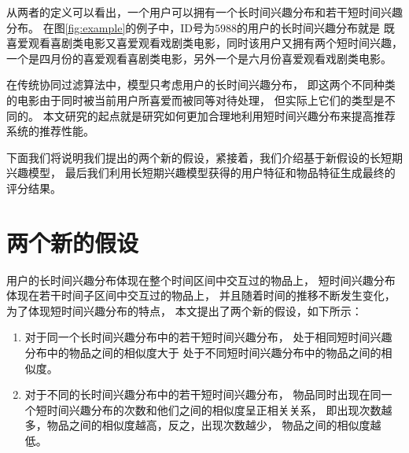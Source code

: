 从两者的定义可以看出，一个用户可以拥有一个长时间兴趣分布和若干短时间兴趣分布。
在图\ref{fig:example}的例子中，ID号为$5988$的用户的长时间兴趣分布就是
既喜爱观看喜剧类电影又喜爱观看戏剧类电影，同时该用户又拥有两个短时间兴趣，
一个是四月份的喜爱观看喜剧类电影，另外一个是六月份喜爱观看戏剧类电影。

在传统协同过滤算法中，模型只考虑用户的长时间兴趣分布，
即这两个不同种类的电影由于同时被当前用户所喜爱而被同等对待处理，
但实际上它们的类型是不同的。
本文研究的起点就是研究如何更加合理地利用短时间兴趣分布来提高推荐系统的推荐性能。

下面我们将说明我们提出的两个新的假设，紧接着，我们介绍基于新假设的长短期兴趣模型，
最后我们利用长短期兴趣模型获得的用户特征和物品特征生成最终的评分结果。

\section{两个新的假设}
用户的长时间兴趣分布体现在整个时间区间中交互过的物品上，
短时间兴趣分布体现在若干时间子区间中交互过的物品上，
并且随着时间的推移不断发生变化，为了体现短时间兴趣分布的特点，
本文提出了两个新的假设，如下所示：

\begin{enumerate}
\item 对于同一个长时间兴趣分布中的若干短时间兴趣分布，
处于相同短时间兴趣分布中的物品之间的相似度大于
处于不同短时间兴趣分布中的物品之间的相似度。
\item 对于不同的长时间兴趣分布中的若干短时间兴趣分布，
物品同时出现在同一个短时间兴趣分布的次数和他们之间的相似度呈正相关关系，
即出现次数越多，物品之间的相似度越高，反之，出现次数越少，
物品之间的相似度越低。
\end{enumerate}

